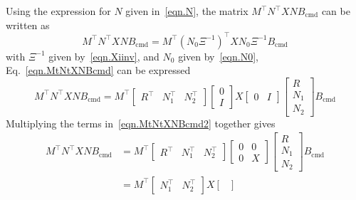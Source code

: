 \begin{proof-dan}
  Using the expression for $N$ given in\ \eqref{eqn.N}, the matrix $M^{\top}N^{\top}XNB_{\text{cmd}}$ can be written as
  \begin{equation}
    \label{eqn.MtNtXNBcmd}
    M^{\top}N^{\top}XNB_{\text{cmd}}
    =
    M^{\top}(N_{0}\Xi^{-1})^{\top}XN_{0}\Xi^{-1}B_{\text{cmd}}
  \end{equation}
  with $\Xi^{-1}$ given by\ \eqref{eqn.Xiinv}, and $N_{0}$ given by\ \eqref{eqn.N0}, Eq.\ \eqref{eqn.MtNtXNBcmd} can be expressed
  \begin{equation}
    \label{eqn.MtNtXNBcmd2}
    M^{\top}N^{\top}XNB_{\text{cmd}}
    =
    M^{\top}
    \begin{bmatrix}
      R^{\top} & N_{1}^{\top} & N_{2}^{\top}
    \end{bmatrix}
    \begin{bmatrix}
      0 \\
      I
    \end{bmatrix}
    X
    \begin{bmatrix}
      0 & I
    \end{bmatrix}
    \begin{bmatrix}
      R \\
      N_{1} \\
      N_{2}
    \end{bmatrix}
    B_{\text{cmd}}
  \end{equation}
  Multiplying the terms in\ \eqref{eqn.MtNtXNBcmd2} together gives
  \begin{equation*}
    \begin{split}
      M^{\top}N^{\top}XNB_{\text{cmd}}
      &=
      M^{\top}
      \begin{bmatrix}
        R^{\top} & N_{1}^{\top} & N_{2}^{\top}
      \end{bmatrix}
      \begin{bmatrix}
        0 & 0 \\
        0 & X
      \end{bmatrix}
      \begin{bmatrix}
        R \\
        N_{1} \\
        N_{2}
      \end{bmatrix}
      B_{\text{cmd}} \\
      &=
      M^{\top}
      \begin{bmatrix}
        N_{1}^{\top} & N_{2}^{\top}
      \end{bmatrix}
      X
      \begin{bmatrix}

\end{bmatrix}
\end{split}
\end{equation*}
\end{proof-dan}
